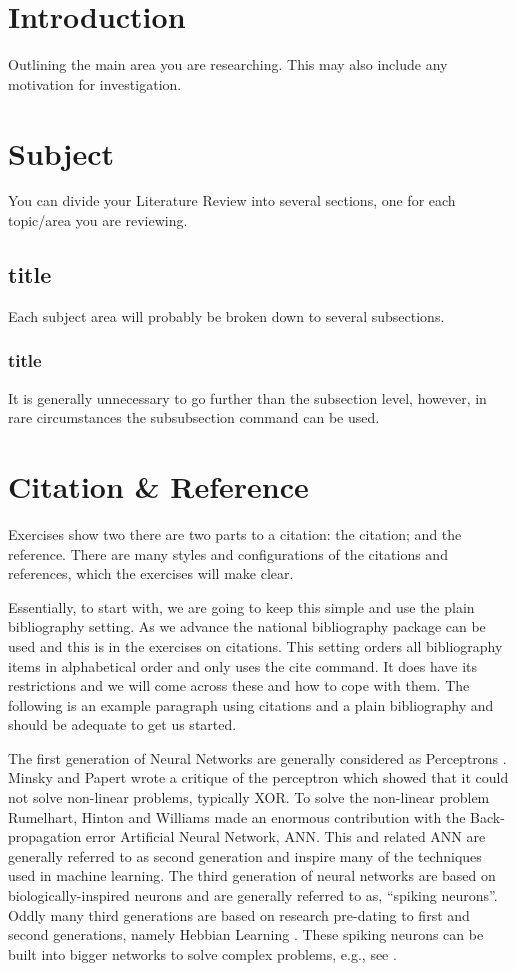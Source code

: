 \section{Introduction}
Outlining the main area you are researching. This may also include any motivation for investigation.
\section{Subject}
You can divide your Literature Review into several sections, one for each topic/area you are reviewing.
\subsection{title}
Each subject area will probably be broken down to several subsections.
\subsubsection{title}
It is generally unnecessary to go further than the subsection level, however, in rare circumstances the subsubsection command can be used. 

\section{Citation \& Reference}
Exercises show two there are two parts to a citation: the citation; and the reference. There are many styles and configurations of the citations and references, which the exercises will make clear. 

Essentially, to start with, we are going to keep this simple and use the plain bibliography setting. As we advance the national bibliography package can be used and this is in the exercises on citations. This setting orders all bibliography items in alphabetical order and only uses the cite command. It does have its restrictions and we will come across these and how to cope with them. The following is an example paragraph using citations and a plain bibliography and should be adequate to get us started.


The first generation of Neural Networks are generally considered as Perceptrons \cite{rosenblatt1958perceptron}. Minsky and Papert \cite{minsky1969perceptrons} wrote a critique of the perceptron which showed that it could not solve non-linear problems, typically XOR. To solve the non-linear problem Rumelhart, Hinton and Williams \cite{rumelhart1985learning} made an enormous contribution with the Back-propagation error Artificial Neural Network, ANN. This and related ANN are generally referred to as second generation and inspire many of the techniques used in machine learning. The third generation of neural networks are based on biologically-inspired neurons and are generally referred to as, ``spiking neurons''.  Oddly many third generations are based on research pre-dating to first and second generations, namely Hebbian Learning \cite{Hebb}. These spiking neurons can be built into bigger networks to solve complex problems, e.g., see \cite{huyck2013compensatory}.


